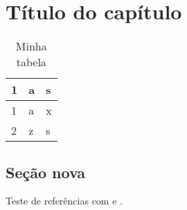 \documentclass[12pt]{report}
\begin{document}
\clearpage
\linenumbers %
\modulolinenumbers[3] %
\chapter{Título do capítulo}
\lipsum[2-4] \lipsum[1]
\begin{table}[]
\centering
\caption{Minha tabela}
\label{my-label}
\begin{tabular}{lll}
1 & a & s \\ \hline
1 & a & x \\
2 & z & s
\end{tabular}
\end{table}
\section{Seção nova}
\lipsum[2-3]
Teste de referências com \cite{Rodrigues2016} e \cite{kopka2004guide}.





\end{document}
